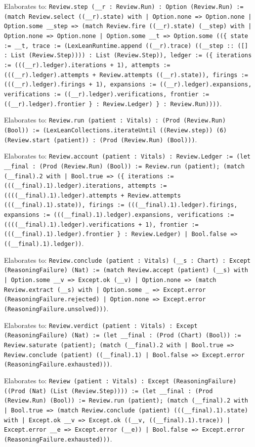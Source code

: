 \documentclass[11pt]{article}
\begin{document}
\noindent Elaborates to: \texttt{Review.step (\_\_r : Review.Run) : Option (Review.Run) := (match Review.select ((\_\_r).state) with | Option.none => Option.none | Option.some \_\_step => (match Review.fire ((\_\_r).state) (\_\_step) with | Option.none => Option.none | Option.some \_\_t => Option.some ((\{ state := \_\_t, trace := (LexLeanRuntime.append ((\_\_r).trace) ((\_\_step :: ([] : List (Review.Step)))) : List (Review.Step)), ledger := (\{ iterations := (((\_\_r).ledger).iterations + 1), attempts := (((\_\_r).ledger).attempts + Review.attempts ((\_\_r).state)), firings := (((\_\_r).ledger).firings + 1), expansions := ((\_\_r).ledger).expansions, verifications := ((\_\_r).ledger).verifications, frontier := ((\_\_r).ledger).frontier \} : Review.Ledger) \} : Review.Run))))}.\par
\noindent Elaborates to: \texttt{Review.run (patient : Vitals) : (Prod (Review.Run) (Bool)) := (LexLeanCollections.iterateUntil ((Review.step)) (6) (Review.start (patient)) : (Prod (Review.Run) (Bool)))}.\par
\noindent Elaborates to: \texttt{Review.account (patient : Vitals) : Review.Ledger := (let \_\_final : (Prod (Review.Run) (Bool)) := Review.run (patient); (match (\_\_final).2 with | Bool.true => (\{ iterations := (((\_\_final).1).ledger).iterations, attempts := ((((\_\_final).1).ledger).attempts + Review.attempts (((\_\_final).1).state)), firings := (((\_\_final).1).ledger).firings, expansions := (((\_\_final).1).ledger).expansions, verifications := ((((\_\_final).1).ledger).verifications + 1), frontier := (((\_\_final).1).ledger).frontier \} : Review.Ledger) | Bool.false => ((\_\_final).1).ledger))}.\par
\noindent Elaborates to: \texttt{Review.conclude (patient : Vitals) (\_\_s : Chart) : Except (ReasoningFailure) (Nat) := (match Review.accept (patient) (\_\_s) with | Option.some \_\_v => Except.ok (\_\_v) | Option.none => (match Review.extract (\_\_s) with | Option.some \_ => Except.error (ReasoningFailure.rejected) | Option.none => Except.error (ReasoningFailure.unsolved)))}.\par
\noindent Elaborates to: \texttt{Review.verdict (patient : Vitals) : Except (ReasoningFailure) (Nat) := (let \_\_final : (Prod (Chart) (Bool)) := Review.saturate (patient); (match (\_\_final).2 with | Bool.true => Review.conclude (patient) ((\_\_final).1) | Bool.false => Except.error (ReasoningFailure.exhausted)))}.\par
\noindent Elaborates to: \texttt{Review (patient : Vitals) : Except (ReasoningFailure) ((Prod (Nat) (List (Review.Step)))) := (let \_\_final : (Prod (Review.Run) (Bool)) := Review.run (patient); (match (\_\_final).2 with | Bool.true => (match Review.conclude (patient) (((\_\_final).1).state) with | Except.ok \_\_v => Except.ok ((\_\_v, ((\_\_final).1).trace)) | Except.error \_\_e => Except.error (\_\_e)) | Bool.false => Except.error (ReasoningFailure.exhausted)))}.\par
\end{document}
